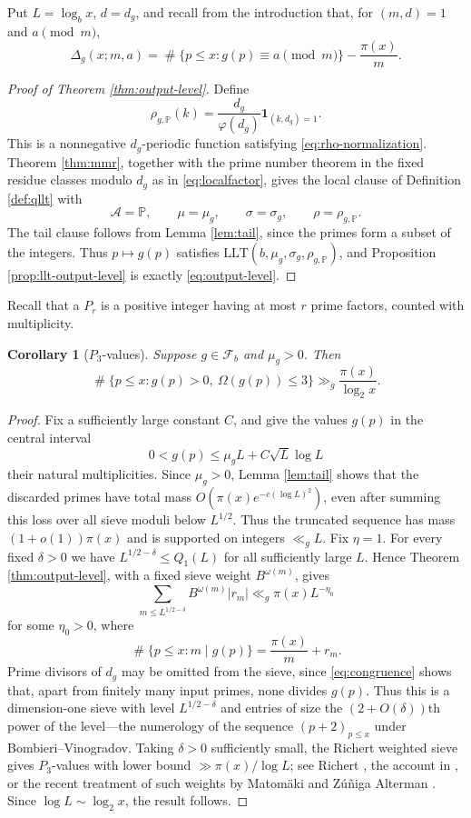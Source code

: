 \documentclass[11pt,reqno]{amsart}
\theoremstyle{plain}
\newtheorem{corollary}[theorem]{Corollary}
\theoremstyle{definition}
\newcommand{\Pp}{\mathbb{P}}
\newcommand{\1}{\mathbf 1}
\DeclareMathOperator{\Card}{\#}
\begin{document}
Put $L=\log_bx$, $d=d_g$, and recall from the introduction that, for $(m,d)=1$ and $a\pmod m$,
\[
 \Delta_g(x;m,a)=\Card\{p\le x:g(p)\equiv a\pmod m\}-\frac{\pi(x)}m.
\]

\begin{proof}[Proof of Theorem \ref{thm:output-level}]
Define
\[
 \rho_{g,\Pp}(k)=\frac{d_g}{\varphi(d_g)}\1_{(k,d_g)=1}.
\]
This is a nonnegative $d_g$-periodic function satisfying \eqref{eq:rho-normalization}.  Theorem \ref{thm:mmr}, together with the prime number theorem in the fixed residue classes modulo $d_g$ as in \eqref{eq:localfactor}, gives the local clause of Definition \ref{def:qllt} with
\[
 \mathcal A=\Pp,\qquad
 \mu=\mu_g,\qquad
 \sigma=\sigma_g,\qquad
 \rho=\rho_{g,\Pp}.
\]
The tail clause follows from Lemma \ref{lem:tail}, since the primes form a subset of the integers.  Thus $p\mapsto g(p)$ satisfies
$\mathrm{LLT}(b,\mu_g,\sigma_g,\rho_{g,\Pp})$, and Proposition \ref{prop:llt-output-level} is exactly \eqref{eq:output-level}.
\end{proof}

Recall that a $P_r$ is a positive integer having at most $r$ prime factors, counted with multiplicity.

\begin{corollary}[$P_3$-values]\label{cor:p3}
Suppose $g\in\mathcal F_b$ and $\mu_g>0$.  Then
\[
 \Card\{p\le x:g(p)>0,\ \Omega(g(p))\le3\}
 \gg_g \frac{\pi(x)}{\log_2x}.
\]
\end{corollary}

\begin{proof}
Fix a sufficiently large constant $C$, and give the values $g(p)$ in the central interval
\[
 0<g(p)\le \mu_gL+C\sqrt L\log L
\]
their natural multiplicities.  Since $\mu_g>0$, Lemma \ref{lem:tail} shows that the discarded primes have total mass $O(\pi(x)e^{-c(\log L)^2})$, even after summing this loss over all sieve moduli below $L^{1/2}$.  Thus the truncated sequence has mass $(1+o(1))\pi(x)$ and is supported on integers $\ll_g L$.  Fix $\eta=1$.  For every fixed $\delta>0$ we have $L^{1/2-\delta}\le Q_1(L)$ for all sufficiently large $L$.  Hence Theorem \ref{thm:output-level}, with a fixed sieve weight $B^{\omega(m)}$, gives
\[
 \sum_{m\le L^{1/2-\delta}}B^{\omega(m)}|r_m|\ll_g\pi(x)L^{-\eta_0}
\]
for some $\eta_0>0$, where
\[
 \Card\{p\le x:m\mid g(p)\}=\frac{\pi(x)}m+r_m.
\]
Prime divisors of $d_g$ may be omitted from the sieve, since \eqref{eq:congruence} shows that, apart from finitely many input primes, none divides $g(p)$.  Thus this is a dimension-one sieve with level $L^{1/2-\delta}$ and entries of size the $(2+O(\delta))$th power of the level---the numerology of the sequence $(p+2)_{p\le x}$ under Bombieri--Vinogradov.  Taking $\delta>0$ sufficiently small, the Richert weighted sieve gives $P_3$-values with lower bound $\gg\pi(x)/\log L$; see Richert \cite{richert}, the account in \cite[Theorem 9.2]{halberstamrichert}, or the recent treatment of such weights by Matom\"aki and Z\'u\~niga Alterman \cite{matomakizuniga}.  Since $\log L\sim\log_2x$, the result follows.
\end{proof}
\end{document}
